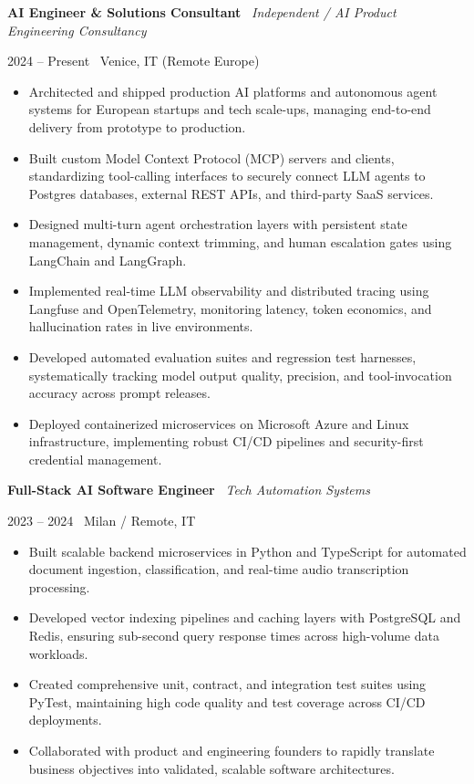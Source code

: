 \documentclass[a4paper,10pt]{article}
\newcommand{\role}[4]{%
  \vspace{2pt}\noindent
  \begin{minipage}[t]{0.70\textwidth}\raggedright\textbf{#1} \textbullet\ \textit{#3}\end{minipage}%
  \hfill
  \begin{minipage}[t]{0.28\textwidth}\raggedleft\footnotesize\color{gray}#2 \textbullet\ #4\end{minipage}%
  \vspace{1pt}%
}
\begin{document}
\role{AI Engineer \& Solutions Consultant}{2024 -- Present}{Independent / AI Product Engineering Consultancy}{Venice, IT (Remote Europe)}
\begin{itemize}
  \item Architected and shipped production AI platforms and autonomous agent systems for European startups and tech scale-ups, managing end-to-end delivery from prototype to production.
  \item Built custom Model Context Protocol (MCP) servers and clients, standardizing tool-calling interfaces to securely connect LLM agents to Postgres databases, external REST APIs, and third-party SaaS services.
  \item Designed multi-turn agent orchestration layers with persistent state management, dynamic context trimming, and human escalation gates using LangChain and LangGraph.
  \item Implemented real-time LLM observability and distributed tracing using Langfuse and OpenTelemetry, monitoring latency, token economics, and hallucination rates in live environments.
  \item Developed automated evaluation suites and regression test harnesses, systematically tracking model output quality, precision, and tool-invocation accuracy across prompt releases.
  \item Deployed containerized microservices on Microsoft Azure and Linux infrastructure, implementing robust CI/CD pipelines and security-first credential management.
\end{itemize}

\vspace{3pt}
\role{Full-Stack AI Software Engineer}{2023 -- 2024}{Tech Automation Systems}{Milan / Remote, IT}
\begin{itemize}
  \item Built scalable backend microservices in Python and TypeScript for automated document ingestion, classification, and real-time audio transcription processing.
  \item Developed vector indexing pipelines and caching layers with PostgreSQL and Redis, ensuring sub-second query response times across high-volume data workloads.
  \item Created comprehensive unit, contract, and integration test suites using PyTest, maintaining high code quality and test coverage across CI/CD deployments.
  \item Collaborated with product and engineering founders to rapidly translate business objectives into validated, scalable software architectures.
\end{itemize}
\end{document}

